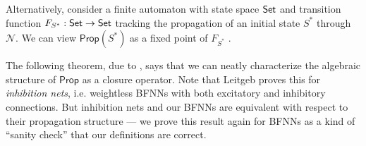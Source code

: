 \documentclass[letterpaper]{article}
\theoremstyle{definition}
\newcommand{\Set}{\mbox{\sf Set}}
\newcommand{\Prop}{\textsf{Prop}}
\newcommand{\Net}{\mathcal{N}}
\begin{document}
Alternatively, consider a finite automaton with state space $\Set$ and transition function $F_{S^\ast} : \Set \to \Set$ tracking the propagation of an initial state $S^\ast$ through $\Net$.  We can view $\Prop(S^\ast)$ as a fixed point of $F_{S^\ast}$ \citep{leitgeb2001nonmonotonic}.

The following theorem, due to \citep{leitgeb2001nonmonotonic}, says that we can neatly characterize the algebraic structure of $\Prop$ as a closure operator. Note that Leitgeb proves this for \emph{inhibition nets}, i.e. weightless BFNNs with both excitatory and inhibitory connections. But inhibition nets and our BFNNs are equivalent with respect to their propagation structure --- we prove this result again for BFNNs as a kind of ``sanity check'' that our definitions are correct.
\end{document}
